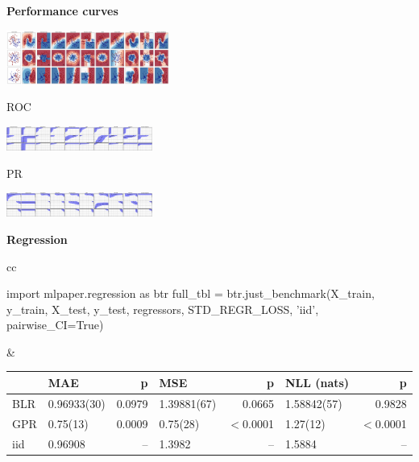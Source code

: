 \documentclass[a0,landscape]{a0poster}
\newcommand{\sectionx}{\textbf}
\begin{document}
\begin{multicols}{2}
\columnbreak

\sectionx{Performance curves}

\includegraphics[width=0.4\textwidth]{output.png}\\
\begin{minipage}[b][2.7in][c]{1.6in}
ROC
\end{minipage}
\includegraphics[width=0.36\textwidth]{AUC.png}\\
\begin{minipage}[b][2.7in][c]{1.6in}
PR
\end{minipage}
\includegraphics[width=0.36\textwidth]{AP.png}

\sectionx{Regression}

\vspace{-1cm}

{\normalsize
\begin{tabular}{cc}
\begin{pycode}
import mlpaper.regression as btr
full_tbl = btr.just_benchmark(X_train, y_train, X_test, y_test,
                              regressors, STD_REGR_LOSS, 'iid',
                              pairwise_CI=True)
\end{pycode}
&
{\footnotesize
\begin{tabular}{|l|l|r|l|r|l|r|}
\toprule
{}  &        {MAE} &     {p} &        {MSE} &      {p} & {NLL (nats)} &      {p} \\
\midrule
BLR &  0.96933(30) &  0.0979 &  1.39881(67) &   0.0665 &  1.58842(57) &   0.9828 \\
GPR &  0.75(13)    &  0.0009 &  0.75(28)    &  $<$0.0001 &  1.27(12)    &  $<$0.0001 \\
iid &  0.96908     &    {--} &  1.3982      &     {--} &  1.5884      &     {--} \\
\bottomrule
\end{tabular}
}
\end{tabular}
}

\end{multicols}
\end{document}
